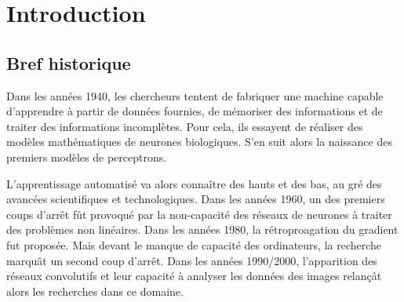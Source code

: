 \section{Introduction}

\subsection{Bref historique}
Dans les années 1940, les chercheurs tentent de fabriquer une machine capable d'apprendre à partir de données fournies, de mémoriser des informations et de traiter des informations incomplètes. Pour cela, ils essayent de réaliser des modèles mathématiques de neurones biologiques. S'en suit alors la naissance des premiers modèles de perceptrons. 

L'apprentissage automatisé va alors connaître des hauts et des bas, au gré des avancées scientifiques et technologiques. Dans les années 1960, un des premiers coups d'arrêt fût provoqué par la non-capacité des réseaux de neurones à traiter des problèmes non linéaires. Dans les années 1980, la rétroproagation du gradient fut proposée. Mais devant le manque de capacité des ordinateurs, la recherche marquât un second coup d'arrêt. Dans les années 1990/2000, l'apparition des réseaux convolutifs et leur capacité à analyser les données des images relançât alors les recherches dans ce domaine.

